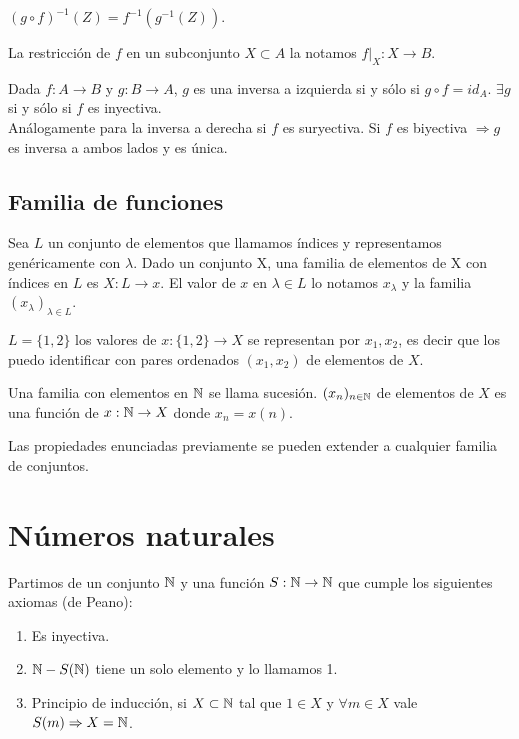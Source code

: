 \begin{prop}
    $(g \circ f)^{-1}(Z) = f^{-1}(g^{-1}(Z))$.
\end{prop}

\begin{definition}
    La restricción de $f$ en un subconjunto $X \subset A$ la notamos $f|_X: X \to B$.
\end{definition}

\begin{definition}
    Dada $f: A \to B$ y $g: B \to A$, $g$ es una inversa a izquierda si y sólo si $g \circ f = id_A$. $\exists g$ si y sólo si $f$ es inyectiva. \\
    Análogamente para la inversa a derecha si $f$ es suryectiva.
    Si $f$ es biyectiva $\Rightarrow g$ es inversa a ambos lados y es única.
\end{definition}

\subsection{Familia de funciones}

Sea $L$ un conjunto de elementos que llamamos índices y representamos genéricamente con $\lambda$. Dado un conjunto X, una familia de elementos de X con índices en $L$ es $X: L \to x$.
El valor de $x$ en $\lambda \in L$ lo notamos $x_\lambda$ y la familia $(x_\lambda)_{\lambda \in L}$.

\begin{eg}
    $L = \{ 1, 2 \}$ los valores de $x: \{1, 2\} \to X$ se representan por $x_1, x_2$, es decir que los puedo identificar con pares ordenados $(x_1, x_2)$ de elementos de $X$.
\end{eg}

Una familia con elementos en $\mathbb{N}$ se llama sucesión. $(x_n)_{n \in \mathbb{N}}$ de elementos de $X$ es una función de $x: \mathbb{N} \to X$ donde $x_n = x(n)$.

Las propiedades enunciadas previamente se pueden extender a cualquier familia de conjuntos.

\section{Números naturales}

Partimos de un conjunto $\mathbb{N}$ y una función $S: \mathbb{N} \to \mathbb{N}$ que cumple los siguientes axiomas (de Peano):
\begin{enumerate}
    \item Es inyectiva.
    \item $\mathbb{N} - S(\mathbb{N})$ tiene un solo elemento y lo llamamos 1.
    \item Principio de inducción, si $X \subset \mathbb{N}$ tal que $1 \in X$ y $\forall m \in X$ vale $S(m) \Rightarrow X = \mathbb{N}$.
\end{enumerate}


